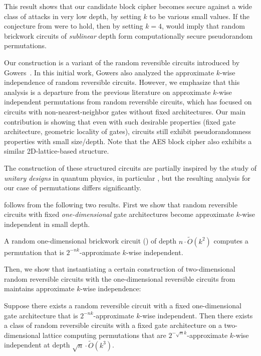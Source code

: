 This result shows that our candidate block cipher becomes secure against a wide class of attacks in very low depth, by setting $k$ to be various small values. If the conjecture from \cite{hoory2005simple} were to hold, then by setting $k=4$,  would imply that random brickwork circuits of \emph{sublinear} depth form computationally secure pseudorandom permutations. 

Our construction is a variant of the random reversible circuits introduced by Gowers~\cite{gowers1996almost}. In this initial work, Gowers also analyzed the approximate $k$-wise independence of random reversible circuits. However, we emphasize that this analysis is a departure from the previous literature on approximate $k$-wise independent permutations from random reversible circuits, which has focused on circuits with non-nearest-neighbor gates without fixed architectures. Our main contribution is showing that even with such desirable properties (fixed gate architecture, geometric locality of gates), circuits still exhibit pseudorandomness properties with small size/depth. Note that the AES block cipher also exhibits a similar 2D-lattice-based structure. 

The construction of these structured circuits are partially inspired by the study of \textit{unitary designs} in quantum physics, in particular \cite{brandao2016local,harrow2023approximate}, but the resulting analysis for our case of permutations differs significantly. 

 follows from the following two results. First we show that random reversible circuits with fixed \textit{one-dimensional} gate architectures become approximate $k$-wise independent in small depth.

\begin{theorem}\label{thm:1D main}
    A random one-dimensional brickwork circuit () of depth $n\cdot\widetilde{O}(k^2)$ computes a permutation that is $2^{-nk}$-approximate $k$-wise independent.
\end{theorem}

Then, we show that instantiating a certain construction of two-dimensional random reversible circuits with the one-dimensional reversible circuits from  maintains approximate $k$-wise independence:

\begin{theorem}\label{thm:2D to 1D reduction}
    Suppose there exists a random reversible circuit with a fixed one-dimensional gate architecture that is $2^{-nk}$-approximate $k$-wise independent. Then there exists a class of random reversible circuits with a fixed gate architecture on a two-dimensional lattice computing permutations that are $2^{-\sqrt{n}k}$-approximate $k$-wise independent at depth $\sqrt{n} \cdot \widetilde{O}(k^3)$.
\end{theorem}


